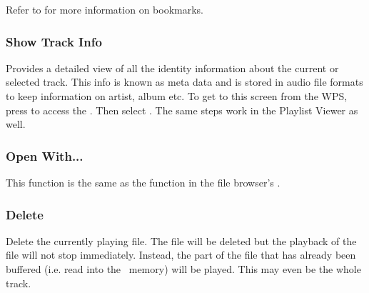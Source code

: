 
Refer to  for more information on bookmarks.

\subsubsection{\label{ref:trackinfoviewer}Show Track Info}
Provides a detailed view of all the identity information about the current
or selected track. This info is known as meta data and is stored in audio
file formats to keep information on artist, album etc. To get to this screen
from the WPS, %
%
%
      {press \ActionWpsContext{} to access the
      . Then select . The same steps
      work in the Playlist Viewer as well.}

\subsubsection{Open With...}
This  function is the same as the 
function in the file browser's .

\subsubsection{Delete}
Delete the currently playing file. The file will be deleted but the playback
of the file will not stop immediately. Instead, the part of the file that
has already been buffered (i.e. read into the \daps\ memory) will be played.
This may even be the whole track.

